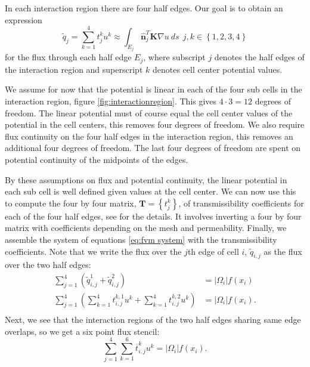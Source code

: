 \documentclass[../Main/main.tex]{subfiles}
\begin{document}
	In each interaction region there are four half edges. Our goal is to obtain an expression 
	\begin{equation*}
		\tilde{q}_j  = \sum_{k=1}^4 t^{k}_j u^k  \approx \int_{E_j}\hat{\bm{n}}_j^T \bm{K} \nabla u \  ds \ \ j,k \in \left \{ 1,2,3,4 \right \}
	\end{equation*}
	for the flux through each half edge $E_j$, where subscript $j$ denotes the half edges of the interaction region and superscript $k$ denotes cell center potential values.
	\par
	We assume for now that the potential is linear in each of the four sub cells in the interaction region, figure  \ref{fig:interactionregion}. This gives $4\cdot 3 = 12$ degrees of freedom. The linear potential must of course equal the cell center values of the potential in the cell centers, this removes four degrees of freedom. We also require flux continuity on the four half edges in the interaction region, this removes an additional four degrees of freedom. The last four degrees of freedom are spent on potential continuity of the midpoints of the edges. 
	\par
	By these assumptions on flux and potential continuity, the linear potential in each sub cell is well defined given values at the cell center. We can now use this to compute the four by four matrix, $\bm{T}=\left \{ t^{k}_j \right \}$,  of transmissibility coefficients  for each of the four half edges, see \cite{Aavatsmark2002} for the details. It involves inverting a four by four matrix with coefficients depending on the mesh and permeability. Finally, we assemble the system of equations \eqref{eq:fvm system} with the transmissibility coefficients. Note that we write the flux over the $j$th edge of cell $i$, $\tilde{q}_{i,j}$ as the flux over the two half edges:
	\begin{equation*}
		\begin{aligned}
			\sum_{j=1}^4 (\tilde{q}_{i,j}^1 + \tilde{q}_{i,j}^2) &= |\Omega_i|f(x_i) \\
			\sum_{j=1}^4 (\sum_{k=1}^4 t^{k,1}_{i,j}u^k + \sum_{k=1}^4 t^{k,2}_{i,j}u^k)&= |\Omega_i|f(x_i).\\
		\end{aligned}
	\end{equation*}
	Next, we see that the interaction regions of the two half edges sharing same edge overlaps, so we get a six point flux stencil:
	\begin{equation*}
		\sum_{j=1}^4 \sum_{k=1}^6 \overline{t}^{k}_{i,j}u^k = |\Omega_i|f(x_i).
	\end{equation*}
\end{document}
